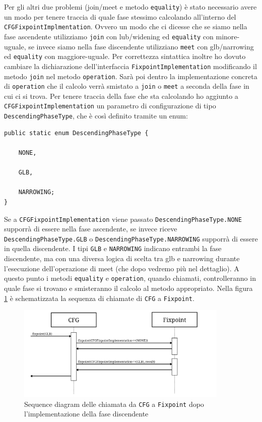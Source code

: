 Per gli altri due problemi (join/meet e metodo \texttt{equality}) è stato necessario avere un modo per tenere traccia di quale fase stessimo calcolando all'interno del \texttt{CFGFixpointImplmentation}. Ovvero un modo che ci dicesse che se siamo nella fase ascendente utilizziamo \texttt{join} con lub/widening ed \texttt{equality} con minore-uguale, se invece siamo nella fase discendente utilizziano \texttt{meet} con glb/narrowing ed \texttt{equality} con maggiore-uguale. Per correttezza sintattica inoltre ho dovuto cambiare la dichiarazione dell'interfaccia \texttt{FixpointImplementation} modificando il metodo \texttt{join} nel metodo \texttt{operation}. Sarà poi dentro la implementazione concreta di \texttt{operation} che il calcolo verrà smistato a \texttt{join} o \texttt{meet} a seconda della fase in cui ci si trova. Per tenere traccia della fase che sta calcolando ho aggiunto a \texttt{CFGFixpointImplementation} un parametro di configurazione di tipo \texttt{DescendingPhaseType}, che è così definito tramite un enum:  
\begin{lstlisting}[belowskip=-1.1 \baselineskip, escapechar=|]
public static enum DescendingPhaseType {

    NONE,
    
    GLB,
    
    NARROWING;
}
\end{lstlisting}
Se a \texttt{CFGFixpointImplementation} viene passato \texttt{DescendingPhaseType.NONE} supporrà di essere nella fase ascendente, se invece riceve \texttt{DescendingPhaseType.GLB} o \texttt{DescendingPhaseType.NARROWING} supporrà di essere in quella discendente. I tipi \texttt{GLB} e \texttt{NARROWING} indicano entrambi la fase discendente, ma con una diversa logica di scelta tra glb e narrowing durante l'esecuzione dell'operazione di meet (che dopo vedremo più nel dettaglio). A questo punto i metodi \texttt{equality} e \texttt{operation}, quando chiamati, controlleranno in quale fase si trovano e smisteranno il calcolo al metodo appropriato. Nella figura \ref{fig:flowFaseDisc} è schematizzata la sequenza di chiamate di \texttt{CFG} a \texttt{Fixpoint}.

\begin{figure}[ht]
	\centering
	\includegraphics[width=0.9\textwidth]{Immagini/flowFaseDisc.png}
	\caption{Sequence diagram delle chiamata da \texttt{CFG} a \texttt{Fixpoint} dopo l'implementazione della fase discendente}
	\label{fig:flowFaseDisc}
\end{figure}

